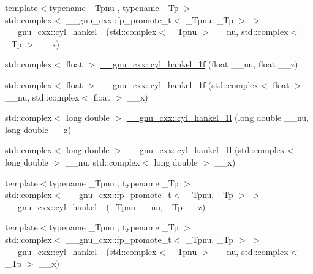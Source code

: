 \begin{DoxyCompactItemize}
\item 
{\footnotesize template$<$typename \+\_\+\+Tpnu , typename \+\_\+\+Tp $>$ }\\std\+::complex$<$ \+\_\+\+\_\+gnu\+\_\+cxx\+::fp\+\_\+promote\+\_\+t$<$ \+\_\+\+Tpnu, \+\_\+\+Tp $>$ $>$ \hyperlink{group__gnu__math__spec__func_ga2f111212d3ec713625acb6986daa925f}{\+\_\+\+\_\+gnu\+\_\+cxx\+::cyl\+\_\+hankel\+\_} (std\+::complex$<$ \+\_\+\+Tpnu $>$ \+\_\+\+\_\+nu, std\+::complex$<$ \+\_\+\+Tp $>$ \+\_\+\+\_\+x)
\item 
std\+::complex$<$ float $>$ \hyperlink{group__gnu__math__spec__func_ga89758ed03e56567baa62b90cc4784f71}{\+\_\+\+\_\+gnu\+\_\+cxx\+::cyl\+\_\+hankel\+\_\+1f} (float \+\_\+\+\_\+nu, float \+\_\+\+\_\+z)
\item 
std\+::complex$<$ float $>$ \hyperlink{group__gnu__math__spec__func_ga810e021a3f11c1b2253c15c6f4d41143}{\+\_\+\+\_\+gnu\+\_\+cxx\+::cyl\+\_\+hankel\+\_\+1f} (std\+::complex$<$ float $>$ \+\_\+\+\_\+nu, std\+::complex$<$ float $>$ \+\_\+\+\_\+x)
\item 
std\+::complex$<$ long double $>$ \hyperlink{group__gnu__math__spec__func_gacb49c66b4267fbc56906db02f14365f2}{\+\_\+\+\_\+gnu\+\_\+cxx\+::cyl\+\_\+hankel\+\_\+1l} (long double \+\_\+\+\_\+nu, long double \+\_\+\+\_\+z)
\item 
std\+::complex$<$ long double $>$ \hyperlink{group__gnu__math__spec__func_ga6900f79ec70673bcb001538aec74e07c}{\+\_\+\+\_\+gnu\+\_\+cxx\+::cyl\+\_\+hankel\+\_\+1l} (std\+::complex$<$ long double $>$ \+\_\+\+\_\+nu, std\+::complex$<$ long double $>$ \+\_\+\+\_\+x)
\item 
{\footnotesize template$<$typename \+\_\+\+Tpnu , typename \+\_\+\+Tp $>$ }\\std\+::complex$<$ \+\_\+\+\_\+gnu\+\_\+cxx\+::fp\+\_\+promote\+\_\+t$<$ \+\_\+\+Tpnu, \+\_\+\+Tp $>$ $>$ \hyperlink{group__gnu__math__spec__func_ga7ebc71dd48ac97255d72f5f5f43dfd8e}{\+\_\+\+\_\+gnu\+\_\+cxx\+::cyl\+\_\+hankel\+\_} (\+\_\+\+Tpnu \+\_\+\+\_\+nu, \+\_\+\+Tp \+\_\+\+\_\+z)
\item 
{\footnotesize template$<$typename \+\_\+\+Tpnu , typename \+\_\+\+Tp $>$ }\\std\+::complex$<$ \+\_\+\+\_\+gnu\+\_\+cxx\+::fp\+\_\+promote\+\_\+t$<$ \+\_\+\+Tpnu, \+\_\+\+Tp $>$ $>$ \hyperlink{group__gnu__math__spec__func_ga326764c0d2dca072c411573503968e50}{\+\_\+\+\_\+gnu\+\_\+cxx\+::cyl\+\_\+hankel\+\_} (std\+::complex$<$ \+\_\+\+Tpnu $>$ \+\_\+\+\_\+nu, std\+::complex$<$ \+\_\+\+Tp $>$ \+\_\+\+\_\+x)
\item 

\end{DoxyCompactItemize}
